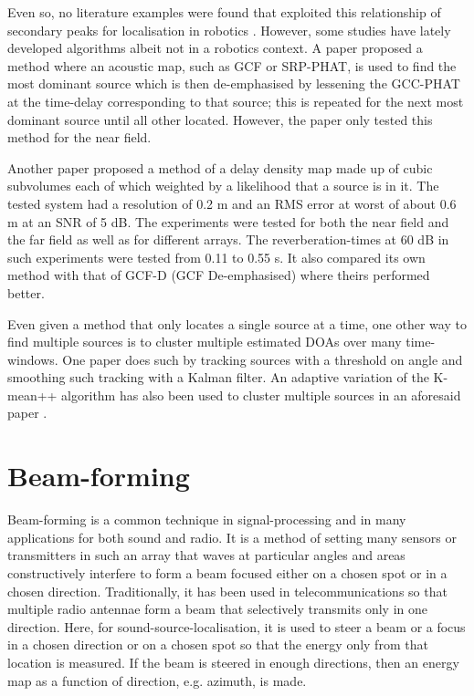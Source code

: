 \documentclass{report}
\begin{document}
Even so, no literature examples were found that exploited this relationship of secondary peaks for localisation in robotics \cite{rascon_localization_2017}. However, some studies have lately developed algorithms albeit not in a robotics context. A paper \cite{brutti_multiple_2010} proposed a method where an acoustic map, such as GCF or SRP-PHAT, is used to find the most dominant source which is then de-emphasised by lessening the GCC-PHAT at the time-delay corresponding to that source; this is repeated for the next most dominant source until all other located. However, the paper only tested this method for the near field.

Another paper \cite{boora_tdoa-based_2020} proposed a method of a delay density map made up of cubic subvolumes each of which weighted by a likelihood that a source is in it. The tested system had a resolution of 0.2 \si{m} and an RMS error at worst of about 0.6 \si{m} at an SNR of 5 \si{dB}. The experiments were tested for both the near field and the far field as well as for different arrays. The reverberation-times at 60 \si{dB} in such experiments were tested from 0.11 to 0.55 \si{s}. It also compared its own method with that of GCF-D (GCF De-emphasised) where theirs performed better.

Even given a method that only locates a single source at a time, one other way to find multiple sources is to cluster multiple estimated DOAs over many time-windows. One paper \cite{rascon_lightweight_2015} does such by tracking sources with a threshold on angle and smoothing such tracking with a Kalman filter. An adaptive variation of the K-mean++ algorithm has also been used to cluster multiple sources in an aforesaid paper \cite{hu_estimation_2009}.

\section{Beam-forming}

Beam-forming is a common technique in signal-processing and in many applications for both sound and radio. It is a method of setting many sensors or transmitters in such an array that waves at particular angles and areas constructively interfere to form a beam focused either on a chosen spot or in a chosen direction. Traditionally, it has been used in telecommunications so that multiple radio antennae form a beam that selectively transmits only in one direction. Here, for sound-source-localisation, it is used to steer a beam or a focus in a chosen direction or on a chosen spot so that the energy only from that location is measured. If the beam is steered in enough directions, then an energy map as a function of direction, e.g. azimuth, is made.
\end{document}
